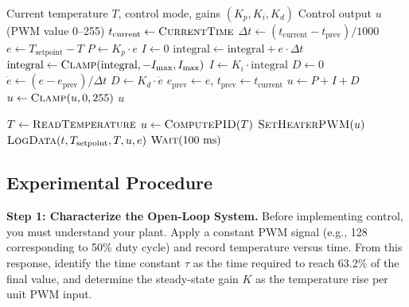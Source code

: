 \begin{algorithm}[htbp]
\caption{PID Control Computation}
\label{alg:pid_compute}
\begin{algorithmic}[1]
\Require Current temperature $T$, control mode, gains $(K_p, K_i, K_d)$
\Ensure Control output $u$ (PWM value 0--255)
\State $t_{\text{current}} \gets \Call{CurrentTime}{}$
\State $\Delta t \gets (t_{\text{current}} - t_{\text{prev}}) / 1000$ 
    \State {}
\EndIf
\State $e \gets T_{\text{setpoint}} - T$ 
\State $P \gets K_p \cdot e$ 
\State $I \gets 0$
 
    \State $\text{integral} \gets \text{integral} + e \cdot \Delta t$
    \State $\text{integral} \gets \Call{Clamp}{\text{integral}, -I_{\text{max}}, I_{\text{max}}}$ 
    \State $I \gets K_i \cdot \text{integral}$
\EndIf
\State $D \gets 0$
 
    \State $\dot{e} \gets (e - e_{\text{prev}}) / \Delta t$
    \State $D \gets K_d \cdot \dot{e}$
\EndIf
\State $e_{\text{prev}} \gets e$, $t_{\text{prev}} \gets t_{\text{current}}$ 
\State $u \gets P + I + D$
\State $u \gets \Call{Clamp}{u, 0, 255}$ 
\State \Return $u$
\end{algorithmic}
\end{algorithm}

\begin{algorithm}[htbp]
\caption{PID Controller Main Loop}
\label{alg:pid_main}
\begin{algorithmic}[1]
\Loop
    \State $T \gets \Call{ReadTemperature}{}$ 
    \State $u \gets \Call{ComputePID}{T}$ 
    \State $\Call{SetHeaterPWM}{u}$ 
    \State $\Call{LogData}{t, T_{\text{setpoint}}, T, u, e}$ 
    \State $\Call{Wait}{100\text{ ms}}$ 
\EndLoop
\end{algorithmic}
\end{algorithm}

\subsection{Experimental Procedure}

\textbf{Step 1: Characterize the Open-Loop System.}
Before implementing control, you must understand your plant. Apply a constant PWM signal (e.g., 128 corresponding to 50\% duty cycle) and record temperature versus time. From this response, identify the time constant $\tau$ as the time required to reach 63.2\% of the final value, and determine the steady-state gain $K$ as the temperature rise per unit PWM input.


